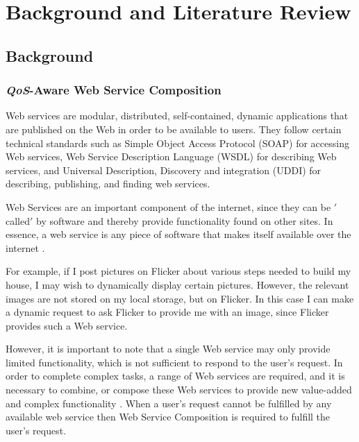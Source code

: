 \chapter{Background and Literature Review}\label{C:ex}
\section{Background}
\subsection{\emph{QoS}-Aware Web Service Composition}

Web services \cite{24} are modular, distributed, self-contained, dynamic applications that are published on the Web in order to be available to users. They follow certain technical standards such as Simple Object Access Protocol (SOAP) \cite{24} for accessing Web services, Web Service Description Language (WSDL) \cite{24} for describing Web services, and Universal Description, Discovery and integration (UDDI) \cite{25} for describing, publishing, and finding web services. \par

Web Services are an important component of the internet, since they can be $'$called$'$ by software and thereby provide functionality found on other sites. In essence, a web service is any piece of software that makes itself available over the internet \cite{27}.\par

For example, if I post pictures on Flicker about various steps needed to build my house, I may wish to dynamically display certain pictures. However, the relevant images are not stored on my local storage, but on Flicker. In this case I can make a dynamic request to ask Flicker to provide me with an image, since Flicker provides such a Web service.\par

However, it is important to note that a single Web service may only provide limited functionality, which is not sufficient to respond to the user's request. In order to complete complex tasks, a range of Web services are required, and it is necessary to combine, or compose these Web services to provide new value-added and complex functionality \cite{28}. When a user's request cannot be fulfilled by any available web service then Web Service Composition is required to fulfill the user's request.\

